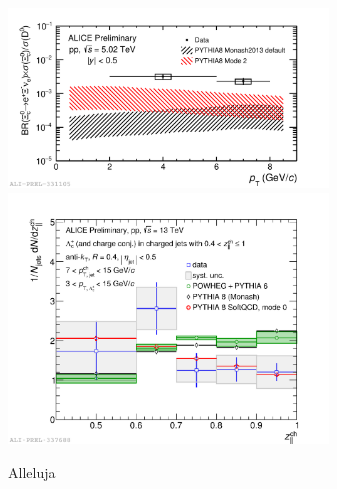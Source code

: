 \documentclass[3p,times,procedia]{elsarticle}
\begin{document}
\begin{figure}[h]
\includegraphics[width=8.5cm]{Plots/Xi_c/2019-10-28-2019-10-28-Xic0toD0_5TeV_wModel1.pdf}
\includegraphics[width=8.5cm]{Plots/FF/2019-10-31-finalwsys_wmodels_pt_jet_7_15.pdf}
\caption{Alleluja}
\label{fig:future}
\end{figure}













\end{document}
